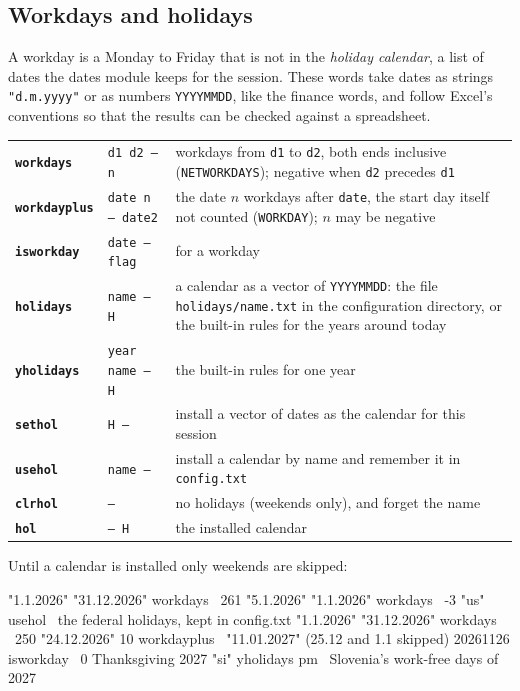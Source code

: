 \documentclass[11pt,letterpaper]{article}
\newcommand{\code}[1]{\texttt{#1}}
\newcommand{\cmd}[1]{\texttt{\textbf{#1}}}
\newcommand{\stk}[1]{\texttt{#1}}
\begin{document}
\subsection{Workdays and holidays}
\label{sec:workdays}

A workday is a Monday to Friday that is not in the \emph{holiday calendar}, a list of dates the dates module keeps for the session. These words take dates as strings \code{"d.m.yyyy"} or as numbers \code{YYYYMMDD}, like the finance words, and follow Excel's conventions so that the results can be checked against a spreadsheet.

\begin{center}
\begin{tabular}{@{}l>{\raggedright\arraybackslash}p{}>{\raggedright\arraybackslash}p{}@{}}
\toprule
\cmd{workdays}    & \stk{d1 d2 -- n}   & workdays from \code{d1} to \code{d2}, both ends inclusive (\code{NETWORKDAYS}); negative when \code{d2} precedes \code{d1} \\
\cmd{workdayplus} & \stk{date n -- date2} & the date $n$ workdays after \code{date}, the start day itself not counted (\code{WORKDAY}); $n$ may be negative \\
\cmd{isworkday}   & \stk{date -- flag} & 1 for a workday \\
\cmd{holidays}    & \stk{name -- H}    & a calendar as a vector of \code{YYYYMMDD}: the file \code{holidays/name.txt} in the configuration directory, or the built-in rules for the years around today \\
\cmd{yholidays}   & \stk{year name -- H} & the built-in rules for one year \\
\cmd{sethol}      & \stk{H --}         & install a vector of dates as the calendar for this session \\
\cmd{usehol}      & \stk{name --}      & install a calendar by name and remember it in \code{config.txt} \\
\cmd{clrhol}      & \stk{--}           & no holidays (weekends only), and forget the name \\
\cmd{hol}         & \stk{-- H}         & the installed calendar \\
\bottomrule
\end{tabular}
\end{center}

Until a calendar is installed only weekends are skipped:
\begin{rpn}
"1.1.2026" "31.12.2026" workdays     \ 261
"5.1.2026" "1.1.2026" workdays       \ -3
"us" usehol                          \ the federal holidays, kept in config.txt
"1.1.2026" "31.12.2026" workdays     \ 250
"24.12.2026" 10 workdayplus          \ "11.01.2027"   (25.12 and 1.1 skipped)
20261126 isworkday                   \ 0              Thanksgiving
2027 "si" yholidays pm               \ Slovenia's work-free days of 2027
\end{rpn}
\end{document}
